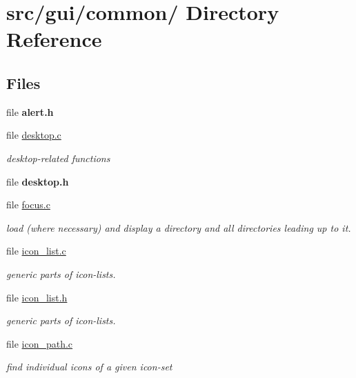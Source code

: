 \hypertarget{dir_000005}{
\section{src/gui/common/ Directory Reference}
\label{dir_000005}
}
\subsection*{Files}
\begin{CompactItemize}
\item 
file {\bf alert.h}
\item 
file \hyperlink{desktop_8c}{desktop.c}
\begin{CompactList}\small\item\em desktop-related functions \item\end{CompactList}

\item 
file {\bf desktop.h}
\item 
file \hyperlink{focus_8c}{focus.c}
\begin{CompactList}\small\item\em load (where necessary) and display a directory and all directories leading up to it. \item\end{CompactList}

\item 
file \hyperlink{icon__list_8c}{icon\_\-list.c}
\begin{CompactList}\small\item\em generic parts of icon-lists. \item\end{CompactList}

\item 
file \hyperlink{icon__list_8h}{icon\_\-list.h}
\begin{CompactList}\small\item\em generic parts of icon-lists. \item\end{CompactList}

\item 
file \hyperlink{icon__path_8c}{icon\_\-path.c}
\begin{CompactList}\small\item\em find individual icons of a given icon-set \item\end{CompactList}


\end{CompactItemize}
